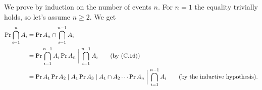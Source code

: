 We prove by induction on the number of events $n$.
For $n=1$ the equality trivially holds, so let's assume $n\ge2$.
We get
\begin{align*}
    \Pr{\bigcap_{i=1}^nA_i} &= \Pr{A_n\cap\bigcap_{i=1}^{n-1}A_i} \\
    &= \Pr{\bigcap_{i=1}^{n-1}A_i}\Pr{A_n\biggm|\bigcap_{i=1}^{n-1}A_i} \tag{by (C.16)} \\
    &= \Pr{A_1}\Pr{A_2\mid A_1}\Pr{A_3\mid A_1\cap A_2}\cdots\Pr{A_n\biggm|\bigcap_{i=1}^{n-1}A_i} \tag{by the inductive hypothesis}.
\end{align*}
